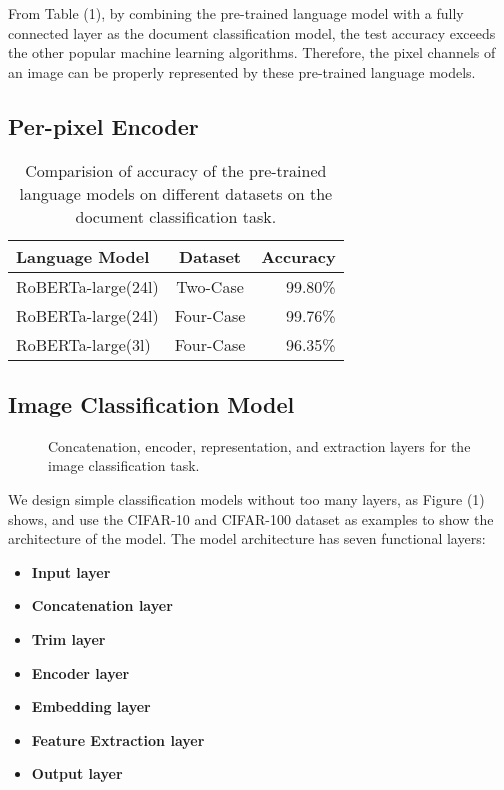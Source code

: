 \documentclass[10pt,twocolumn,letterpaper]{article}
\begin{document}
From Table (1), by combining the pre-trained language model with a fully connected layer as the document classification model,
the test accuracy exceeds the other popular machine learning algorithms.
Therefore, the pixel channels of an image can be properly represented by these pre-trained language models.

\subsection{Per-pixel Encoder}

\begin{table}
\begin{center}
\begin{tabular}{|l|c|r|}
\hline
Language Model 	& Dataset & Accuracy \\
\hline\hline
RoBERTa-large(24l) & Two-Case	&	99.80\% \\
RoBERTa-large(24l) & Four-Case	&	99.76\% \\
RoBERTa-large(3l)  & Four-Case	&	96.35\% \\
\hline
\end{tabular}
\end{center}
\caption{Comparision of accuracy of the pre-trained language models on different datasets on the document classification task.}
\end{table}


\subsection{Image Classification Model}

\begin{figure*}
\begin{center}
\end{center}
   \caption{Concatenation, encoder, representation, and extraction layers for the image classification task.}
\label{fig:short}
\end{figure*}

We design simple classification models without too many layers, as Figure (1) shows,
and use the CIFAR-10 and CIFAR-100 dataset as examples to show the architecture of the model.
The model architecture has seven functional layers:

\begin{itemize}
\item {\bf Input layer}
\item {\bf Concatenation layer}
\item {\bf Trim layer}
\item {\bf Encoder layer}
\item {\bf Embedding layer}
\item {\bf Feature Extraction layer}
\item {\bf Output layer}
\end{itemize}
\end{document}
